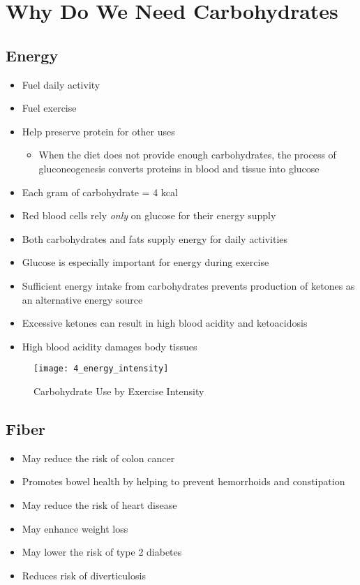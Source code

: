 \documentclass[title={Chapter 4}]{fdsn201notes}
\begin{document}
\section{Why Do We Need Carbohydrates}\label{sec:why-do-we-need-carbohydrates}
\subsection{Energy}\label{subsec:energy}
\begin{itemize}
	\item Fuel daily activity
	\item Fuel exercise
	\item Help preserve protein for other uses
	\begin{itemize}
		\item When the diet does not provide enough carbohydrates, the process of gluconeogenesis\label{dfn:gluconeogenesis} converts proteins in blood and tissue into glucose
	\end{itemize}
	\item Each gram of carbohydrate = 4 kcal
	\item Red blood cells rely \emph{only} on glucose for their energy supply
	\item Both carbohydrates and fats supply energy for daily activities
	\item Glucose is especially important for energy during exercise
	\item Sufficient energy intake from carbohydrates prevents production of ketones\label{dfn:ketones} as an alternative energy source
	\item Excessive ketones can result in high blood acidity and ketoacidosis
	\item High blood acidity damages body tissues
\end{itemize}

\begin{figure}[H]
	\centering
	\texttt{[image: 4\_energy\_intensity]}
	\caption{Carbohydrate Use by Exercise Intensity}
	\label{fig:carb-energy-intensity}
\end{figure}

\subsection{Fiber}\label{subsec:why-we-need-fiber}
\begin{itemize}
	\item May reduce the risk of colon cancer
	\item Promotes bowel health by helping to prevent hemorrhoids and constipation
	\item May reduce the risk of heart disease
	\item May enhance weight loss
	\item May lower the risk of type 2 diabetes
	\item Reduces risk of diverticulosis
\end{itemize}
\end{document}
